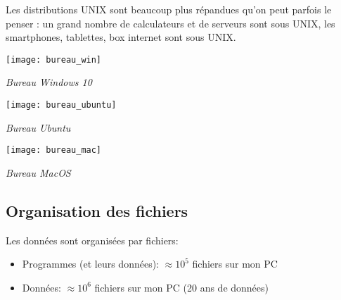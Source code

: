 Les distributions UNIX sont beaucoup plus répandues qu'on peut parfois le penser : un grand nombre de calculateurs et de serveurs sont sous UNIX, les smartphones, tablettes, box internet sont sous UNIX.



\begin{minipage}[c]{.3\linewidth}
\begin{center}
\texttt{[image: bureau\_win]}

\textit{Bureau Windows 10}
\end{center}
\end{minipage} \hfill
\begin{minipage}[c]{.3\linewidth}
\begin{center}
\texttt{[image: bureau\_ubuntu]}

\textit{Bureau Ubuntu}
\end{center}
\end{minipage} \hfill
\begin{minipage}[c]{.3\linewidth}
\begin{center}
\texttt{[image: bureau\_mac]}

\textit{Bureau MacOS}
\end{center}
\end{minipage} 

\subsection{Organisation des fichiers}


Les données sont organisées par fichiers:
  \begin{itemize}
  \item Programmes (et leurs données): $\approx 10^{5}$ fichiers sur mon PC
  \item Données: $\approx 10^{6}$ fichiers sur mon PC (20 ans de données)
  \end{itemize}
  
